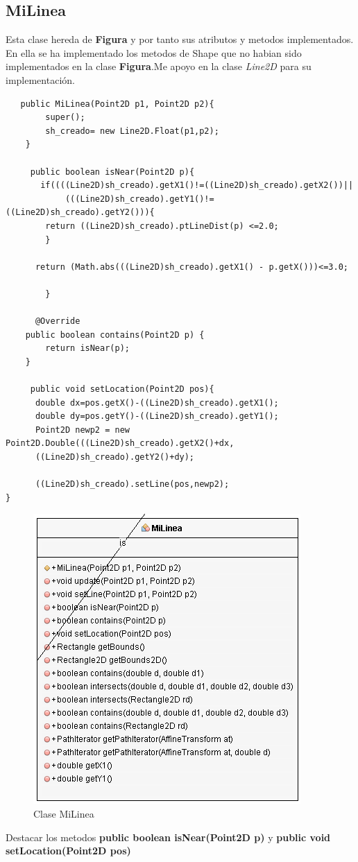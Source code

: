 \subsection{MiLinea}
Esta clase\cite{Linea} hereda de \textbf{Figura} y por tanto sus atributos y metodos implementados. En ella se ha implementado los metodos de Shape que no habian sido implementados en la clase \textbf{Figura}.Me apoyo en la clase \emph{Line2D} para su implementación.
\begin{lstlisting}
   public MiLinea(Point2D p1, Point2D p2){
        super();
        sh_creado= new Line2D.Float(p1,p2);
    }
    
     public boolean isNear(Point2D p){
       if((((Line2D)sh_creado).getX1()!=((Line2D)sh_creado).getX2())||
            (((Line2D)sh_creado).getY1()!=((Line2D)sh_creado).getY2())){
        return ((Line2D)sh_creado).ptLineDist(p) <=2.0; 
        }
           
      return (Math.abs(((Line2D)sh_creado).getX1() - p.getX()))<=3.0;
      
        }
 
      @Override
    public boolean contains(Point2D p) {
        return isNear(p);
    }
    
     public void setLocation(Point2D pos){
      double dx=pos.getX()-((Line2D)sh_creado).getX1();
      double dy=pos.getY()-((Line2D)sh_creado).getY1();
      Point2D newp2 = new Point2D.Double(((Line2D)sh_creado).getX2()+dx,
      ((Line2D)sh_creado).getY2()+dy);
      
      ((Line2D)sh_creado).setLine(pos,newp2);
}
\end{lstlisting}
\begin{figure}[H]
  \centering
    \includegraphics[scale=0.55]{images/milinea2}
  \caption{Clase MiLinea}
  \label{Clases MiLinea}
\end{figure}
Destacar los metodos \textbf{public boolean isNear(Point2D p)} y \textbf{public void setLocation(Point2D pos)}
